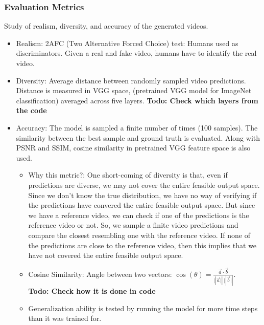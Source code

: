 \documentclass{article}
\begin{document}
    \subsubsection{Evaluation Metrics}\label{subsubsec:Stochastic_Adversarial_Video_Prediction_(SAVP):evaluation-metrics}
    Study of realism, diversity, and accuracy of the generated videos.
    \begin{itemize}
        \item Realism: 2AFC (Two Alternative Forced Choice) test: Humans used as discriminators.
        Given a real and fake video, humans have to identify the real video.
        \item Diversity: Average distance between randomly sampled video predictions.
        Distance is measured in VGG space, (pretrained VGG model for ImageNet classification) averaged across five layers. \textbf{Todo: Check which layers from the code}
        \item Accuracy: The model is sampled a finite number of times (100 samples).
        The similarity between the best sample and ground truth is evaluated.
        Along with PSNR and SSIM, cosine similarity in pretrained VGG feature space is also used.
        \begin{itemize}
            \item Why this metric?: One short-coming of diversity is that, even if predictions are diverse, we may not cover the entire feasible output space.
            Since we don't know the true distribution, we have no way of verifying if the predictions have convered the entire feasible output space.
            But since we have a reference video, we can check if one of the predictions is the reference video or not.
            So, we sample a finite video predictions and compare the closest resembling one with the reference video.
            If none of the predictions are close to the reference video, then this implies that we have not covered the entire feasible output space.
            \item Cosine Similarity: Angle between two vectors: $\cos(\theta) = \frac{\vec{a} \cdot \vec{b}}{\vert|\vec{a}\vert|\ \vert|\vec{b}\vert|}$. \\
            \textbf{Todo: Check how it is done in code}
            \item Generalization ability is tested by running the model for more time steps than it was trained for.
        \end{itemize}
    \end{itemize}
\end{document}
